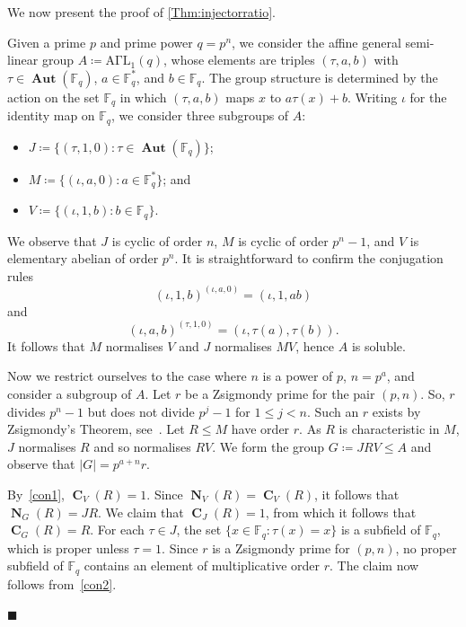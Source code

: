 \documentclass[10pt,a4paper]{amsart}
\numberwithin{equation}{section}
\DeclareMathOperator{\N}{\mathbf{N}}
\DeclareMathOperator{\cent}{\mathbf{C}}
\DeclareMathOperator{\aut}{\mathbf{Aut}}
\renewcommand{\leq}{\leqslant}
\newenvironment{proofofC}{{\bf {Proof of Theorem \ref{Thm:injectorratio}.} }}{\hfill $\blacksquare$ \\}
\def\ff{{\mathbb F}}
\begin{document}
We now present the proof of \autoref{Thm:injectorratio}.

\begin{proofofC}
Given a prime $p$ and prime power $q = p^n$, 
we consider the affine general semi-linear group $A \coloneqq \mathrm{A\Gamma L}_1(q)$, 
whose elements are triples $(\tau, a, b)$ 
with $\tau \in \aut(\ff_q)$, $a \in \ff_q^\ast$, and $b \in \ff_q$. 
The group structure is determined by the action on the set $\ff_q$ 
in which $(\tau, a, b)$ maps $x$ to $a\tau(x) + b$. 
Writing $\iota$ for the identity map on $\ff_q$, 
we consider three subgroups of $A$:
\begin{itemize}
\item $J \coloneqq \{(\tau, 1, 0) : \tau \in \aut(\ff_q)\}$;
\item $M \coloneqq \{(\iota, a, 0) :a \in \ff_q^\ast\}$; and
\item $V \coloneqq \{(\iota, 1, b) : b \in \ff_q\}$.
\end{itemize}
We observe that $J$ is cyclic of order $n$, 
$M$ is cyclic of order $p^n-1$, 
and $V$ is elementary abelian of order $p^n$.  
It is straightforward to confirm the conjugation rules
\begin{equation}\label{con1}
(\iota, 1, b)^{(\iota, a, 0)} = (\iota, 1, ab)
\end{equation}
and
\begin{equation}\label{con2}
(\iota, a, b)^{(\tau, 1, 0)} = (\iota, \tau(a), \tau(b)).
\end{equation}
It follows that $M$ normalises $V$ and $J$ normalises $MV$, 
hence $A$ is soluble.

Now we restrict ourselves to the case where $n$ is a power of $p$, $n = p^a$, 
and consider a subgroup of $A$. 
Let $r$ be a Zsigmondy prime for the pair $(p, n)$. 
So, $r$ divides $p^n-1$ but does not divide $p^j-1$ for $1 \leq j < n$. 
Such an $r$ exists by Zsigmondy's Theorem, see~\cite{Zsigmondy}. 
Let $R \leq M$ have order $r$. 
As $R$ is characteristic in $M$, $J$ normalises $R$ and so normalises $RV$. 
We form the group $G \coloneqq JRV \leq A$ and observe that $|G| = p^{a+n}r$.

By~\eqref{con1}, $\cent_V(R) = 1$. 
Since $\N_V(R) = \cent_V(R)$, it follows that $\N_G(R) = JR$.
We claim that $\cent_J(R) = 1$, 
from which it follows that $\cent_G(R) = R$. 
For each $\tau \in J$, the set $\{x \in \ff_q : \tau(x) = x\}$ is a subfield of $\ff_q$, which is proper unless $\tau = 1$. 
Since $r$ is a Zsigmondy prime for $(p, n)$, no proper subfield of $\ff_q$ contains an element of multiplicative order $r$. 
The claim now follows from~\eqref{con2}.


\end{proofofC}
\end{document}
